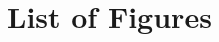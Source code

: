 \section*{List of Figures}
\vspace{-25pt}
\renewcommand{\listfigurename}{}
\listoffigures

\pagebreak
